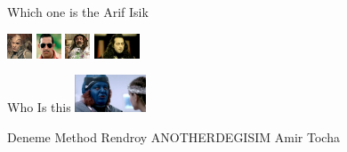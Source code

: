 \documentclass{exam}
\begin{document}
\begin{questions}
\question Which one is the Arif Isik\newline
\begin{oneparchoices}
\choice \includegraphics[height=2em]{216.jpg}
\choice \includegraphics[height=2em]{arifisik.jpg}
\choice \includegraphics[height=2em]{faruk.jpg}
\choice \includegraphics[height=2em]{komutanlogar.jpeg}
\end{oneparchoices}
\question Who Is this\newline
\includegraphics[height=3em]{rendroy2.jpg} \newline
\begin{oneparchoices}
\choice Deneme Method
\choice Rendroy
\choice ANOTHERDEGISIM
\choice Amir Tocha
\end{oneparchoices}
\end{questions}
\end{document}
